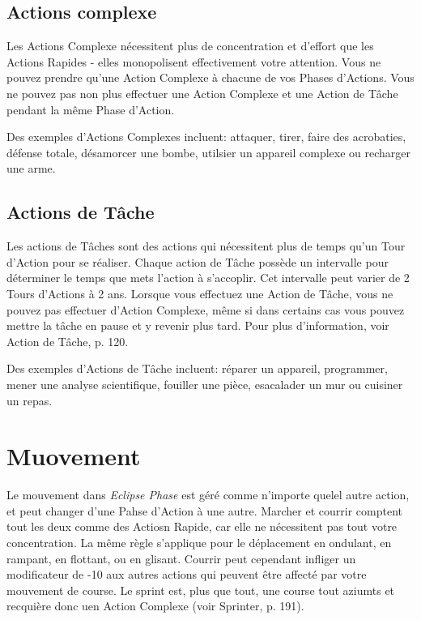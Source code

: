 \subsection{Actions complexe} \label{sec:combat-complex-actions} 

Les Actions Complexe nécessitent plus de concentration et d'effort que les Actions Rapides - elles monopolisent effectivement votre attention. Vous ne pouvez prendre qu'une Action Complexe à chacune de vos Phases d'Actions. Vous ne pouvez pas non plus effectuer une Action Complexe et une Action de Tâche pendant la même Phase d'Action. 

Des exemples d'Actions Complexes incluent: attaquer, tirer, faire des acrobaties, défense totale, désamorcer une bombe, utilsier un appareil complexe ou recharger une arme. 



\subsection{Actions de Tâche} \label{sec:combat-task-actions} 

Les actions de Tâches sont des actions qui nécessitent plus de temps qu'un Tour d'Action pour se réaliser. Chaque action de Tâche possède un intervalle pour déterminer le temps que mets l'action à s'accoplir. Cet intervalle peut varier de 2 Tours d'Actions à 2 ans. Lorsque vous effectuez une Action de Tâche, vous ne pouvez pas effectuer d'Action Complexe, même si dans certains cas vous pouvez mettre la tâche en pause et y revenir plus tard. Pour plus d'information, voir Action de Tâche, p. 120. 

Des exemples d'Actions de Tâche incluent: réparer un appareil, programmer, mener une analyse scientifique, fouiller une pièce, esacalader un mur ou cuisiner un repas. 



\section{Muovement} \label{sec:combat-movement} 

Le mouvement dans \emph{Eclipse Phase} est géré comme n'importe quelel autre action, et peut changer d'une Pahse d'Action à une autre. Marcher et courrir comptent tout les deux comme des Actiosn Rapide, car elle ne nécessitent pas tout votre concentration. La même règle s'applique pour le déplacement en ondulant, en rampant, en flottant, ou en glisant. Courrir peut cependant infliger un modificateur de -10 aux autres actions qui peuvent être affecté par votre mouvement de course. Le sprint est, plus que tout, une course tout aziumts et recquière donc uen Action Complexe (voir Sprinter, p. 191). 

